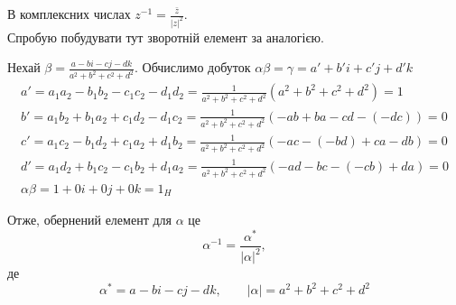 \documentclass[11pt, a4paper]{article} %
\begin{document}
В комплексних числах $z^{-1} = \frac{\bar z}{|z|^2}$. \\
Спробую побудувати тут зворотній елемент за аналогією.

Нехай $\beta = \frac{a-bi-cj-dk}{a^2+b^2+c^2+d^2}$. Обчислимо добуток $\alpha\beta = \gamma = a'+b'i+c'j+d'k$
\begin{gather*}
    a' = a_{1}a_{2}-b_{1}b_{2}-c_{1}c_{2}-d_{1}d_{2} = \frac{1}{a^2+b^2+c^2+d^2}\left(a^2+b^2+c^2+d^2\right) = 1\\
    b' = a_{1}b_{2}+b_{1}a_{2}+c_{1}d_{2}-d_{1}c_{2} = \frac{1}{a^2+b^2+c^2+d^2}\left(-ab+ba-cd-(-dc)\right) = 0\\
    c' = a_{1}c_{2}-b_{1}d_{2}+c_{1}a_{2}+d_{1}b_{2} = \frac{1}{a^2+b^2+c^2+d^2}\left(-ac-(-bd)+ca-db\right) = 0\\
    d' = a_{1}d_{2}+b_{1}c_{2}-c_{1}b_{2}+d_{1}a_{2} = \frac{1}{a^2+b^2+c^2+d^2}\left(-ad-bc-(-cb)+da\right) = 0\\
    \alpha\beta = 1+0i+0j+0k = 1_H
\end{gather*}

Отже, обернений елемент для $\alpha$ це 
\[\alpha^{-1} = \frac{\alpha^*}{|\alpha|^2},\]
де 
\[\alpha^* = a-bi-cj-dk, \qquad |\alpha| = a^2+b^2+c^2+d^2\] 
\end{document}
